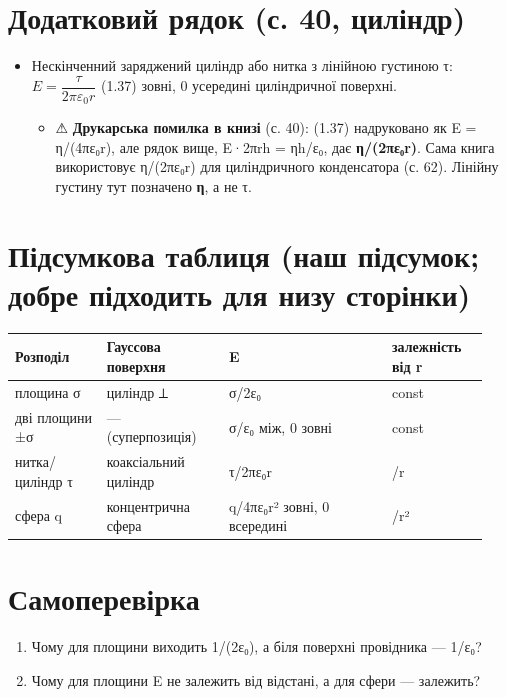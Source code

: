 \documentclass[11pt,a4paper,oneside]{book}
\newcommand{\warn}{{\sffamily\color{warncol}⚠}}
\begin{document}
\section*{Додатковий рядок (с. 40, циліндр)}
\begin{itemize}
\item Нескінченний заряджений циліндр або нитка з лінійною густиною τ: $E = \dfrac{\tau}{2\pi\varepsilon_0 r}$ (1.37) зовні, 0 усередині циліндричної поверхні.
\begin{itemize}
\item \warn{} \textbf{Друкарська помилка в книзі} (с. 40): (1.37) надруковано як E = η/(4πε₀r), але рядок вище, E·2πrh = ηh/ε₀, дає \textbf{η/(2πε₀r)}. Сама книга використовує η/(2πε₀r) для циліндричного конденсатора (с. 62). Лінійну густину тут позначено \textbf{η}, а не τ.
\end{itemize}
\end{itemize}

\section*{Підсумкова таблиця (наш підсумок; добре підходить для низу сторінки)}
{\small
\begin{longtable}{>{\raggedright\arraybackslash}p{0.180\linewidth}>{\raggedright\arraybackslash}p{0.240\linewidth}>{\raggedright\arraybackslash}p{0.324\linewidth}>{\raggedright\arraybackslash}p{0.192\linewidth}}
\toprule
\textbf{Розподіл} & \textbf{Гауссова поверхня} & \textbf{E} & \textbf{залежність від r} \\
\midrule
\endhead
площина σ & циліндр ⟂ & σ/2ε₀ & const \\
дві площини ±σ & — (суперпозиція) & σ/ε₀ між, 0 зовні & const \\
нитка/циліндр τ & коаксіальний циліндр & τ/2πε₀r & 1/r \\
сфера q & концентрична сфера & q/4πε₀r² зовні, 0 всередині & 1/r² \\
\bottomrule
\end{longtable}
}

\section*{Самоперевірка}
\begin{enumerate}
\item Чому для площини виходить 1/(2ε₀), а біля поверхні провідника — 1/ε₀?
\item Чому для площини E не залежить від відстані, а для сфери — залежить?
\end{enumerate}
\end{document}

